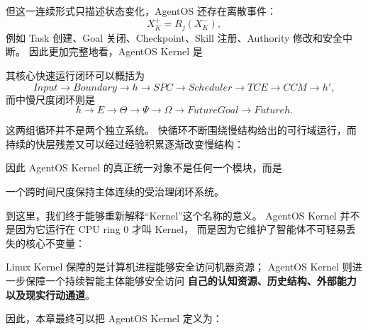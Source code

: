 但这一连续形式只描述状态变化，AgentOS 还存在离散事件：
\[
X_K^+
=
R_j(X_K^-),
\]
例如 Task 创建、Goal 关闭、Checkpoint、Skill 注册、Authority 修改和安全中断。
因此更加完整地看，AgentOS Kernel 是
\begin{statementbox}
\centering
{}
\end{statementbox}

其核心快速运行闭环可以概括为
\[
Input
\rightarrow
Boundary
\rightarrow
h
\rightarrow
SPC
\rightarrow
Scheduler
\rightarrow
TCE
\rightarrow
CCM
\rightarrow
h',
\]
而中慢尺度闭环则是
\[
h
\rightarrow
E
\rightarrow
\Theta
\rightarrow
\Psi
\rightarrow
\Omega
\rightarrow
FutureGoal
\rightarrow
Futureh.
\]

这两组循环并不是两个独立系统。
快循环不断围绕慢结构给出的可行域运行，而持续的快层残差又可以经过经验积累逐渐改变慢结构：
\begin{statementbox}
\centering
{}
\end{statementbox}
\begin{statementbox}
\centering
{}
\end{statementbox}

因此 AgentOS Kernel 的真正统一对象不是任何一个模块，而是
\begin{statementbox}
一个跨时间尺度保持主体连续的受治理闭环系统。
\end{statementbox}

到这里，我们终于能够重新解释``Kernel''这个名称的意义。
AgentOS Kernel 并不是因为它运行在 CPU ring 0 才叫 Kernel，
而是因为它维护了智能体不可轻易丢失的核心不变量：
\begin{statementbox}
\centering
{}
\end{statementbox}

Linux Kernel 保障的是计算机进程能够安全访问机器资源；
AgentOS Kernel 则进一步保障一个持续智能主体能够安全访问
\textbf{自己的认知资源、历史结构、外部能力以及现实行动通道}。

因此，本章最终可以把 AgentOS Kernel 定义为：

